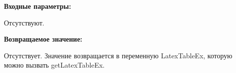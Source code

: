 \textbf{Входные параметры:}

Отсутствуют.

\textbf{Возвращаемое значение:}

Отсутствует. Значение возвращается в переменную LatexTableEx, которую можно вызвать getLatexTableEx.